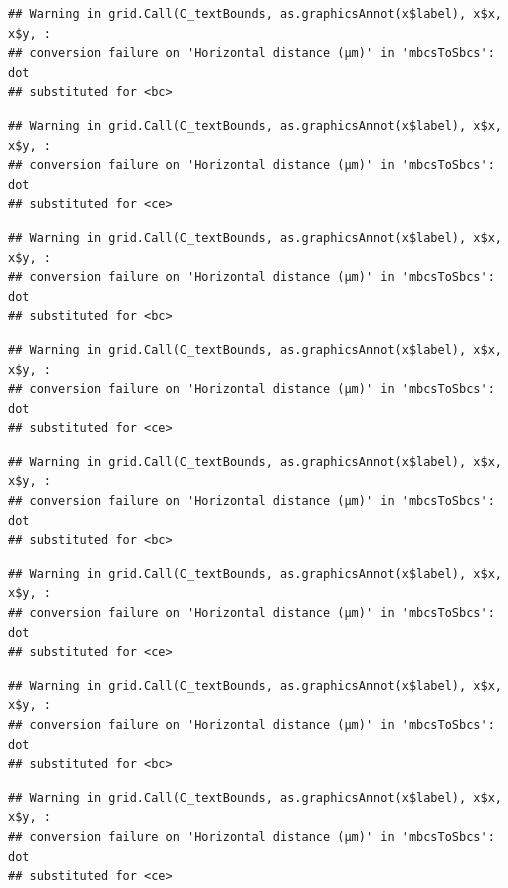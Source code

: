 \documentclass[
]{article}
\begin{document}
\begin{verbatim}
## Warning in grid.Call(C_textBounds, as.graphicsAnnot(x$label), x$x, x$y, :
## conversion failure on 'Horizontal distance (μm)' in 'mbcsToSbcs': dot
## substituted for <bc>
\end{verbatim}

\begin{verbatim}
## Warning in grid.Call(C_textBounds, as.graphicsAnnot(x$label), x$x, x$y, :
## conversion failure on 'Horizontal distance (μm)' in 'mbcsToSbcs': dot
## substituted for <ce>
\end{verbatim}

\begin{verbatim}
## Warning in grid.Call(C_textBounds, as.graphicsAnnot(x$label), x$x, x$y, :
## conversion failure on 'Horizontal distance (μm)' in 'mbcsToSbcs': dot
## substituted for <bc>
\end{verbatim}

\begin{verbatim}
## Warning in grid.Call(C_textBounds, as.graphicsAnnot(x$label), x$x, x$y, :
## conversion failure on 'Horizontal distance (μm)' in 'mbcsToSbcs': dot
## substituted for <ce>
\end{verbatim}

\begin{verbatim}
## Warning in grid.Call(C_textBounds, as.graphicsAnnot(x$label), x$x, x$y, :
## conversion failure on 'Horizontal distance (μm)' in 'mbcsToSbcs': dot
## substituted for <bc>
\end{verbatim}

\begin{verbatim}
## Warning in grid.Call(C_textBounds, as.graphicsAnnot(x$label), x$x, x$y, :
## conversion failure on 'Horizontal distance (μm)' in 'mbcsToSbcs': dot
## substituted for <ce>
\end{verbatim}

\begin{verbatim}
## Warning in grid.Call(C_textBounds, as.graphicsAnnot(x$label), x$x, x$y, :
## conversion failure on 'Horizontal distance (μm)' in 'mbcsToSbcs': dot
## substituted for <bc>
\end{verbatim}

\begin{verbatim}
## Warning in grid.Call(C_textBounds, as.graphicsAnnot(x$label), x$x, x$y, :
## conversion failure on 'Horizontal distance (μm)' in 'mbcsToSbcs': dot
## substituted for <ce>
\end{verbatim}
\end{document}
